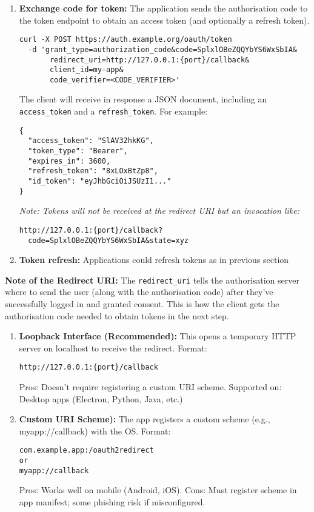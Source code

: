 \documentclass[11pt,a4paper]{ivoa}
\begin{document}
\begin{enumerate}
\item{\textbf{Exchange code for token:} The application sends the authorisation code to the token endpoint to obtain an
                                        access token (and optionally a refresh token).
\begin{verbatim}
curl -X POST https://auth.example.org/oauth/token
  -d 'grant_type=authorization_code&code=SplxlOBeZQQYbYS6WxSbIA&
       redirect_uri=http://127.0.0.1:{port}/callback&
       client_id=my-app&
       code_verifier=<CODE_VERIFIER>'
\end{verbatim}
The client will receive in response a JSON document, including an \verb|access_token| and a \verb|refresh_token|. For example:
\begin{verbatim}
{
  "access_token": "SlAV32hkKG",
  "token_type": "Bearer",
  "expires_in": 3600,
  "refresh_token": "8xLOxBtZp8",
  "id_token": "eyJhbGciOiJSUzI1..."
}
\end{verbatim}
\textit{Note: Tokens will not be received at the redirect URI but an invocation like:}
\begin{verbatim}
http://127.0.0.1:{port}/callback?
  code=SplxlOBeZQQYbYS6WxSbIA&state=xyz
\end{verbatim}
}
\item{\textbf{Token refresh:} Applications could refresh tokens as in previous section}
\end{enumerate}
\textbf{Note of the Redirect URI:}
The \verb|redirect_uri| tells the authorisation server where to send the user (along with the authorisation code) after
they’ve successfully logged in and granted consent.
This is how the client gets the authorisation code needed to obtain tokens in the next step.
\begin{enumerate}
\item{\textbf{Loopback Interface (Recommended):}
This opens a temporary HTTP server on localhost to receive the redirect. Format:
\begin{verbatim}
http://127.0.0.1:{port}/callback
\end{verbatim}

Pros: Doesn't require registering a custom URI scheme. Supported on: Desktop apps (Electron, Python, Java, etc.)}
\item{\textbf{Custom URI Scheme):}
The app registers a custom scheme (e.g., myapp://callback) with the OS.
Format:
\begin{verbatim}
com.example.app:/oauth2redirect
or
myapp://callback
\end{verbatim}
Pros: Works well on mobile (Android, iOS). Cons: Must register scheme in app manifest; some phishing risk if misconfigured.}
\end{enumerate}
\end{document}
